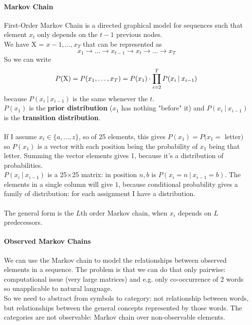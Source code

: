 \documentclass[10pt]{report}
\begin{document}
\paragraph{Markov Chain} First-Order Markov Chain is a directed graphical model for sequences such that element $x_t$ only depends on the $t-1$ previous nodes.\\
We have X = $x-1,\ldots,x_T$ that can be represented as 
$$x_1\rightarrow \ldots\rightarrow x_{t-1}\rightarrow x_t\rightarrow\ldots\rightarrow x_T$$
So we can write $$P(\hbox{X}) = P(x_1,\ldots,x_T) = P(x_1)\cdot\prod_{i=2}^T P(x_i\:|\:x_{i-1})$$
because $P(x_i\:|\:x_{i-1})$ is the same whenever the $t$.\\
$P(x_1)$ is the \textbf{prior distribution} ($x_1$ has nothing "before" it) and $P(x_i\:|\:x_{i-1})$ is the \textbf{transition distribution}.\\\\
If I assume $x_t\in\{a,\ldots,z\}$, so of 25 elements, this gives $P(x_1) = P(x_1 =$ letter$)$ so $P(x_1)$ is a vector with each position being the probability of $x_1$ being that letter. Summing the vector elements gives 1, because it's a distribution of probabilities.\\
$P(x_i\:|\:x_{i-1})$ is a 25$\times$25 matrix: in position $n,b$ is $P(x_i=n\:|\:x_{i-1}=b)$. The elements in a single column will give $1$, because conditional probability gives a family of distribution: for each assignment I have a distribution.\\\\
The general form is the $L$th order Markov chain, when $x_i$ depends on $L$ predecessors.
\paragraph{Observed Markov Chains} We can use the Markov chain to model the relationships between observed elements in a sequence. The problem is that we can do that only pairwise: computational issue (very large matrices) and e.g. only co-occurrence of 2 words so unapplicable to natural language.\\
So we need to abstract from symbols to category: not relationship between words, but relationships between the general concepts represented by those words. The categories are not observable: Markov chain over non-observable elements.
\end{document}
